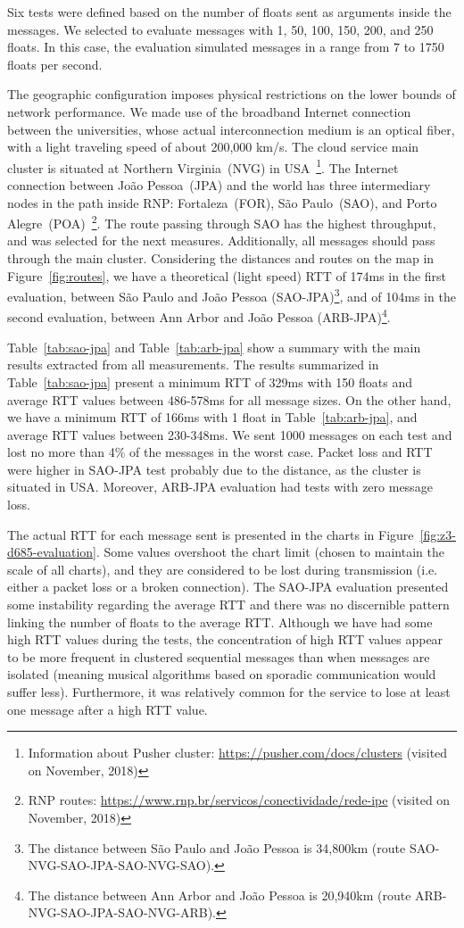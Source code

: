 Six tests were defined based on the number of floats sent as arguments inside the messages.
We selected to evaluate messages with 1, 50, 100, 150, 200, and 250 floats.
In this case, the evaluation simulated messages in a range from 7 to 1750 floats per second.

The geographic configuration imposes physical restrictions on the lower bounds of network performance.
We made use of the broadband Internet connection between the universities, whose actual interconnection medium is an optical fiber, with a light traveling speed of about 200,000 km/s.
The cloud service main cluster is situated at Northern Virginia~(NVG) in USA~\footnote{Information about Pusher cluster: \url{https://pusher.com/docs/clusters} (visited on November, 2018)}.
The Internet connection between Jo\~{a}o Pessoa~(JPA) and the world has three intermediary nodes in the path inside RNP: Fortaleza~(FOR), S\~{a}o Paulo~(SAO), and Porto Alegre~(POA)~\footnote{RNP routes: \url{https://www.rnp.br/servicos/conectividade/rede-ipe} (visited on November, 2018)}.
The route passing through SAO has the highest throughput, and was selected for the next measures.
Additionally, all messages should pass through the main cluster.
Considering the distances and routes on the map in Figure~\ref{fig:routes}, we have a theoretical (light speed) RTT of 174ms in the first evaluation, between S\~{a}o Paulo and Jo\~{a}o Pessoa (SAO-JPA)\footnote{The distance between S\~{a}o Paulo and Jo\~{a}o Pessoa is 34,800km (route SAO-NVG-SAO-JPA-SAO-NVG-SAO).}, and of 104ms in the second evaluation, between Ann Arbor and Jo\~{a}o Pessoa (ARB-JPA)\footnote{The distance between Ann Arbor and Jo\~{a}o Pessoa is 20,940km (route ARB-NVG-SAO-JPA-SAO-NVG-ARB).}.

Table~\ref{tab:sao-jpa} and Table~\ref{tab:arb-jpa} show a summary with the main results extracted from all measurements.
The results summarized in Table~\ref{tab:sao-jpa} present a minimum RTT of 329ms with 150 floats and average RTT values between 486-578ms for all message sizes.
On the other hand, we have a minimum RTT of 166ms with 1 float in Table~\ref{tab:arb-jpa}, and average RTT values between 230-348ms.
We sent 1000 messages on each test and lost no more than 4\% of the messages in the worst case.
Packet loss and RTT were higher in SAO-JPA test probably due to the distance, as the cluster is situated in USA.
Moreover, ARB-JPA evaluation had tests with zero message loss.

The actual RTT for each message sent is presented in the charts in Figure~\ref{fig:z3-d685-evaluation}.
Some values overshoot the chart limit (chosen to maintain the scale of all charts), and they are considered to be lost during transmission (i.e. either a packet loss or a broken connection). 
The SAO-JPA evaluation presented some instability regarding the average RTT and there was no discernible pattern linking the number of floats to the average RTT.
Although we have had some high RTT values during the tests, the concentration of high RTT values appear to be more frequent in clustered sequential messages than when messages are isolated (meaning musical algorithms based on sporadic communication would suffer less). Furthermore, it was relatively common for the service to lose at least one message after a high RTT value.


